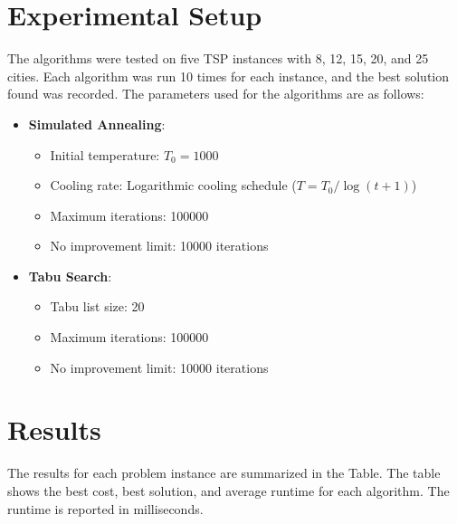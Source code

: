\documentclass{article}
\begin{document}
\section{Experimental Setup}
The algorithms were tested on five TSP instances with 8, 12, 15, 20, and 25 cities. Each algorithm was run 10 times for each instance, and the best solution found was recorded. The parameters used for the algorithms are as follows:
\begin{itemize}
    \item \textbf{Simulated Annealing}:
    \begin{itemize}
        \item Initial temperature: \( T_0 = 1000 \)
        \item Cooling rate: Logarithmic cooling schedule (\( T = T_0 / \log(t + 1) \))
        \item Maximum iterations: 100000
        \item No improvement limit: 10000 iterations
    \end{itemize}
    \item \textbf{Tabu Search}:
    \begin{itemize}
        \item Tabu list size: 20
        \item Maximum iterations: 100000
        \item No improvement limit: 10000 iterations
    \end{itemize}
\end{itemize}

\section{Results}
The results for each problem instance are summarized in the Table. The table shows the best cost, best solution, and average runtime for each algorithm. The runtime is reported in milliseconds.
\end{document}
